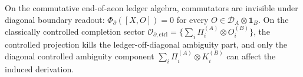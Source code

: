 \begin{remark}
On the commutative end-of-aeon ledger algebra, commutators are invisible under diagonal boundary readout: \(\Phi_\partial([X,O])=0\) for every \(O\in \mathcal D_A\otimes \mathbf 1_B\). On the classically controlled completion sector \(\mathcal O_{\partial,\mathrm{ctrl}}=\{\sum_i \Pi_i^{(A)}\otimes O_i^{(B)}\}\), the controlled projection kills the ledger-off-diagonal ambiguity part, and only the diagonal controlled ambiguity component \(\sum_i \Pi_i^{(A)}\otimes K_i^{(B)}\) can affect the induced derivation.
\end{remark}